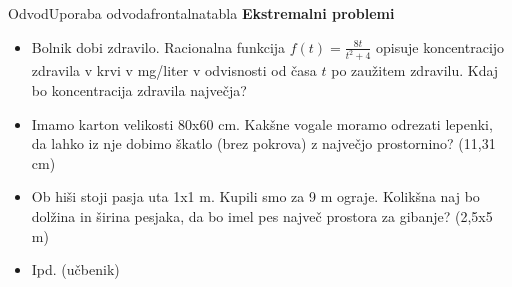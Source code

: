 \begin{priprava}{}{}{Odvod}{Uporaba odvoda}{frontalna}{tabla}
\textbf{Ekstremalni problemi}

\begin{itemize}
    \item Bolnik dobi zdravilo. Racionalna funkcija $ f(t) = \frac{8t}{t^2 + 4} $ opisuje koncentracijo zdravila v krvi v mg/liter v odvisnosti od časa $ t $ po zaužitem zdravilu. Kdaj bo koncentracija zdravila največja?
    

    \item Imamo karton velikosti 80x60 cm. Kakšne vogale moramo odrezati lepenki, da lahko iz nje dobimo škatlo (brez pokrova) z največjo prostornino? (11{,}31 cm)
    \item Ob hiši stoji pasja uta 1x1 m. Kupili smo za 9 m ograje. Kolikšna naj bo dolžina in širina pesjaka, da bo imel pes največ prostora za gibanje? (2{,}5x5 m)
    \item Ipd. (učbenik)
\end{itemize}


\end{priprava}